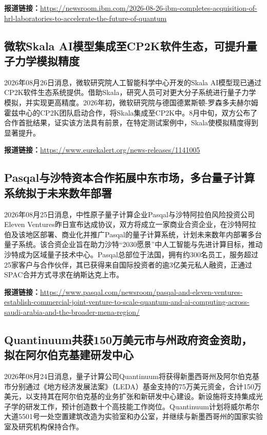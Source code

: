 \documentclass[12pt,a4paper]{ctexart}
\begin{document}
\noindent\textbf{报道链接：}\url{https://newsroom.ibm.com/2026-08-26-ibm-completes-acquisition-of-hrl-laboratories-to-accelerate-the-future-of-quantum}

\subsection{ 微软Skala AI模型集成至CP2K软件生态，可提升量子力学模拟精度 }

2026年08月26日消息，微软研究院人工智能科学中心开发的Skala AI模型现已通过CP2K软件生态系统提供。借助Skala，研究人员可对更大分子系统进行量子力学模拟，并实现更高精度。2026年初，微软研究院与德国德累斯顿-罗森多夫赫尔姆霍兹中心的CP2K团队启动合作，将Skala集成至CP2K中。8月中旬，双方公布了合作首批结果，证实该方法具有前景，在特定测试案例中，Skala使模拟精度得到显著提升。

\noindent\textbf{报道链接：}\url{https://www.eurekalert.org/news-releases/1141005}

\subsection{ Pasqal与沙特资本合作拓展中东市场，多台量子计算系统拟于未来数年部署 }

2026年08月25日消息，中性原子量子计算企业Pasqal与沙特阿拉伯风险投资公司Eleven Ventures昨日宣布达成协议，双方将成立一家商业合资企业，在沙特阿拉伯及该地区部署、商业化并推广Pasqal的量子计算系统，计划未来数年内部署多台量子系统。该合资企业旨在助力沙特“2030愿景”中人工智能与先进计算目标，推动沙特成为区域量子技术中心。Pasqal总部位于法国，拥有约300名员工，服务超过25家客户与合作伙伴，其已获得来自国际投资者的逾3亿美元私人融资，正通过SPAC合并方式寻求在纳斯达克上市。

\noindent\textbf{报道链接：}\url{https://www.pasqal.com/newsroom/pasqal-and-eleven-ventures-establish-commercial-joint-venture-to-scale-quantum-and-ai-computing-across-saudi-arabia-and-the-broader-mena-region/}

\subsection{ Quantinuum共获150万美元市与州政府资金资助，拟在阿尔伯克基建研发中心 }

2026年08月24日消息，量子计算公司Quantinuum将获得新墨西哥州及阿尔伯克基市分别通过《地方经济发展法案》（LEDA）基金支持的75万美元资金，合计150万美元，以支持其在阿尔伯克基的业务扩张和新研发中心建设。新设施将支持集成光子学的研发工作，预计创造数十个高技能工作岗位。Quantinuum计划将威尔希尔大道5501号一处空置建筑改造为实验室和办公室，并继续与新墨西哥州的国家实验室及研究机构保持合作。
\end{document}
